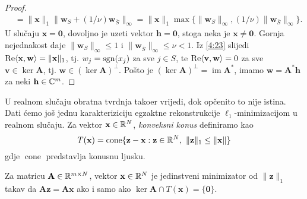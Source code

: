 \documentclass[a4paper,twoside,12pt]{memoir} %
\newcommand{\vect}[1]{\mathbf{#1}}
\renewcommand{\vec}{\vect}
\newcommand{\norm}[1]{\|{#1}\|}
\newcommand{\sgn}{\text{\normalfont{sgn}}}
\renewcommand{\Re}{\text{\normalfont{Re}}}
\DeclareMathOperator{\im}{im}
\DeclareMathOperator{\cone}{cone}
\begin{document}
\begin{proof}
\begin{align*}
        &= \norm{\vec x}_1 \norm{\vec w_S + (1/\nu)\vec w_{\bar S}}_{\infty} = \norm{\vec x}_1 \max\{ \norm{\vec w_S}_{\infty}, (1/\nu) \norm{\vec w_{\bar S}}_{\infty} \}.
    \end{align*}
    U slu\v{c}aju $\vec x = \vec 0$, dovoljno je uzeti vektor $\vec h = \vec 0$, stoga neka je $\vec x \neq \vec 0$. Gornja nejednakost daje $\norm{\vec w_S}_{\infty} \leq 1$ i $\norm{\vec w_{\bar S}}_{\infty} \leq \nu < 1$. Iz \eqref{4:23} slijedi $\Re \langle \vec x, \vec w\rangle = \norm{\vec x}_1$, tj. $w_j = \sgn(x_j)$ za sve $j \in S$, te $\Re \langle \vec v, \vec w \rangle = 0$ za sve $\vec v \in \ker \vec A$, tj. $\vec w \in (\ker \vec A)^{\perp}$. Po\v{s}to je $(\ker \vec A)^{\perp} = \im \vec A^*$, imamo $\vec w = \vec A^* \vec h$ za neki $\vec h \in \C^m$.
\end{proof}
U realnom slu\v{c}aju obratna tvrdnja tako\dj er vrijedi, dok op\v{c}enito to nije istina. Dati \'cemo jo\v{s} jednu karakteriziciju egzaktne rekonstrukcije $\ell_1$-minimizacijom u realnom slu\v{c}aju. Za vektor $\vec x \in \R^N$, \textit{konveksni konus} definiramo kao
\begin{equation}\label{4:34}
    T(\vec x) = \cone \{ \vec z - \vec x : \vec z \in \R^N,\ \norm{\vec z}_1 \leq \norm{\vec x}\} 
\end{equation}
gdje $\cone$ predstavlja konusnu ljusku.
\begin{thm}
    Za matricu $\vec A \in \R^{m \times N}$, vektor $\vec x \in \R^N$ je jedinstveni minimizator od $\norm{\vec z}_1$ takav da $\vec{Az} = \vec{Ax}$ ako i samo ako $\ker \vec A \cap T(\vec x) = \{\vec 0\}$.
\end{thm}
\end{document}
